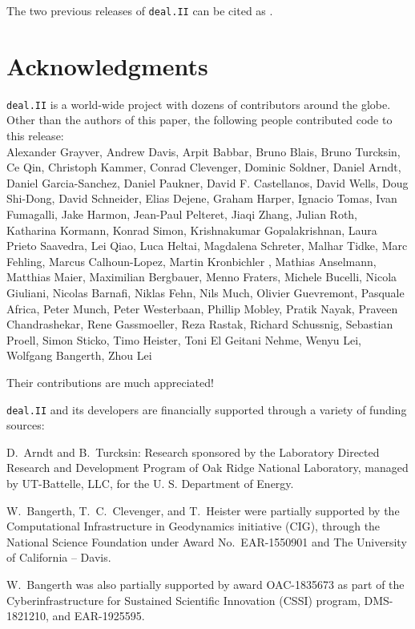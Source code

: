 \documentclass{ansarticle-preprint}
\newcommand{\specialword}[1]{\texttt{#1}}
\newcommand{\dealii}{{\specialword{deal.II}}\xspace}
\begin{document}
The two previous releases of \dealii{} can be cited as
\cite{dealII91,dealII92}.


\section{Acknowledgments}

\dealii{} is a world-wide project with dozens of contributors around the
globe. Other than the authors of this paper, the following people
contributed code to this release:\\
%
%
Alexander Grayver,
Andrew Davis,
Arpit Babbar,
Bruno Blais,
Bruno Turcksin,
Ce Qin,
Christoph Kammer,
Conrad Clevenger,
Dominic Soldner,
Daniel Arndt,
Daniel Garcia-Sanchez,
Daniel Paukner,
David F. Castellanos,
David Wells,
Doug Shi-Dong,
David Schneider,
Elias Dejene,
Graham Harper,
Ignacio Tomas,
Ivan Fumagalli,
Jake Harmon,
Jean-Paul Pelteret,
Jiaqi Zhang,
Julian Roth,
Katharina Kormann,
Konrad Simon,
Krishnakumar Gopalakrishnan,
Laura Prieto Saavedra,
Lei Qiao,
Luca Heltai,
Magdalena Schreter,
Malhar Tidke,
Marc Fehling,
Marcus Calhoun-Lopez,
Martin Kronbichler ,
Mathias Anselmann,
Matthias Maier,
Maximilian Bergbauer,
Menno Fraters,
Michele Bucelli,
Nicola Giuliani,
Nicolas Barnafi,
Niklas Fehn,
Nils Much,
Olivier Guevremont,
Pasquale Africa,
Peter Munch,
Peter Westerbaan,
Phillip Mobley,
Pratik Nayak,
Praveen Chandrashekar,
Rene Gassmoeller,
Reza Rastak,
Richard Schussnig,
Sebastian Proell,
Simon Sticko,
Timo Heister,
Toni El Geitani Nehme,
Wenyu Lei,
Wolfgang Bangerth,
Zhou Lei


Their contributions are much appreciated!


\bigskip

\dealii{} and its developers are financially supported through a
variety of funding sources:

D.~Arndt and B.~Turcksin: Research sponsored by the Laboratory Directed Research and
Development Program of Oak Ridge National Laboratory, managed by UT-Battelle,
LLC, for the U. S. Department of Energy.

W.~Bangerth, T.~C.~Clevenger, and T.~Heister were partially
supported by the Computational Infrastructure
in Geodynamics initiative (CIG), through the National Science
Foundation under Award No.~EAR-1550901 and The
University of California -- Davis.


W.~Bangerth was also partially supported by award OAC-1835673 as part of the Cyberinfrastructure for Sustained Scientific Innovation (CSSI)
program, DMS-1821210,
and EAR-1925595.
\end{document}
